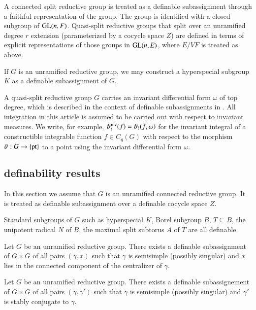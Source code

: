 A connected split reductive group is treated as a definable
subassignment through a faithful representation of the group.  The
group is identified with a closed subgroup of ${\operatorname{GL}}(n,F)$.
Quasi-split reductive groups that split over an unramified degree $r$
extension (parameterized by a cocycle space $Z$) are defined in terms
of explicit representations of those groups in ${\operatorname{GL}}(n,E)$, where
$E/VF$ is treated as above.

If $G$ is an unramified reductive group, we may construct a
hyperspecial subgroup $K$ as a definable subassignment of $G$.

A quasi-split reductive group $G$ carries an invariant differential
form $\omega$ of top degree, which is described in the context of
definable subassignments in \cite{gordon}.  All integration in this
article is assumed to be carried out with respect to invariant
measures.  We write, for example, $\vartheta_!^{\operatorname{inv}}(f) =
\vartheta_!(f,\omega)$ for the invariant integral of a constructible
integrable function $f\in C_q(G)$ with respect to the morphism
$\vartheta:G\to\{{\operatorname{pt}}\}$ to a point using the invariant
differential form $\omega$.

\subsection{definability results}\label{sec:definability}

In this section we assume that $G$ is an unramified connected
reductive group.  It is treated as definable subassignment over a
definable cocycle space $Z$.

Standard subgroups of $G$ such as hyperspecial $K$, Borel subgroup
$B$, $T\subseteq B$, the unipotent radical $N$ of $B$, the maximal
split subtorus $A$ of $T$ are all definable.


\begin{lemma}  
  Let $G$ be an unramified reductive group.  There exists a definable
  subassignment of $G\times G$ of all pairs $(\gamma,x)$ such that
  $\gamma$ is semisimple (possibly singular) and $x$ lies in the
  connected component of the centralizer of $\gamma$.
\end{lemma}

\begin{lemma} 
  Let $G$ be an unramified reductive group.  There exists a definable
  subassignement of $G\times G$ of all pairs $(\gamma,\gamma')$ such
  that $\gamma$ is semisimple (possibly singular) and $\gamma'$ is
  stably conjugate to $\gamma$.
\end{lemma}

